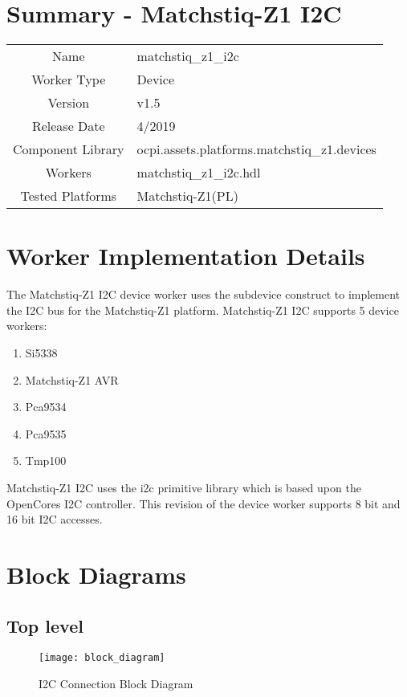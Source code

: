 \documentclass{article}
\author{} %
\date{Version \docVersion} %
\title{\docTitle}
\def\docVersion{1.5}
\def\comp{matchstiq\_z1\_i2c}
\def\Comp{Matchstiq-Z1 I2C}
\begin{document}
\section*{Summary - \Comp}
\begin{tabular}{|c|M{13.5cm}|}
	\hline
	                  &                                        \\
	\hline
	Name              & \comp                                  \\
	\hline
	Worker Type       & Device                                 \\
	\hline
	Version           & v\docVersion \\
	\hline
	Release Date      & 4/2019 \\
	\hline
	Component Library & ocpi.assets.platforms.matchstiq\_z1.devices \\
	\hline
	Workers           & \comp.hdl                              \\
	\hline
	Tested Platforms  & Matchstiq-Z1(PL)                       \\
	\hline
\end{tabular}

\section*{Worker Implementation Details}
The Matchstiq-Z1 I2C device worker uses the subdevice construct to implement the I2C bus for the Matchstiq-Z1 platform. Matchstiq-Z1 I2C supports 5 device workers:
\begin{enumerate}
	\item Si5338
	\item Matchstiq-Z1 AVR
	\item Pca9534
	\item Pca9535
	\item Tmp100
\end{enumerate}
Matchstiq-Z1 I2C uses the i2c primitive library which is based upon the OpenCores I2C controller. This revision of the device worker supports 8 bit and 16 bit I2C accesses.

\section*{Block Diagrams}
\subsection*{Top level}
\begin{figure}[ht]
	\centerline{\texttt{[image: block\_diagram]}}
	\caption{I2C Connection Block Diagram}
	\label{fig:tb}
\end{figure}
\end{document}
